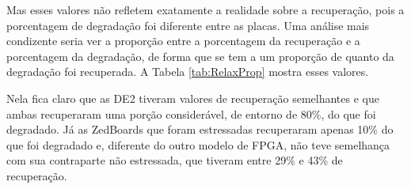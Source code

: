 

Mas esses valores não refletem exatamente a realidade sobre a recuperação, pois a porcentagem de degradação foi diferente entre as placas. Uma análise mais condizente seria ver a proporção entre a porcentagem da recuperação e a porcentagem da degradação, de forma que se tem a um proporção de quanto da degradação foi recuperada. A Tabela \ref{tab:RelaxProp} mostra esses valores.



Nela fica claro que as DE2 tiveram valores de recuperação semelhantes e que ambas recuperaram uma porção considerável, de entorno de 80\%, do que foi degradado. Já as ZedBoards que foram estressadas recuperaram apenas 10\% do que foi degradado e, diferente do outro modelo de FPGA, não teve semelhança com sua contraparte não estressada, que tiveram entre 29\% e 43\% de recuperação. 


